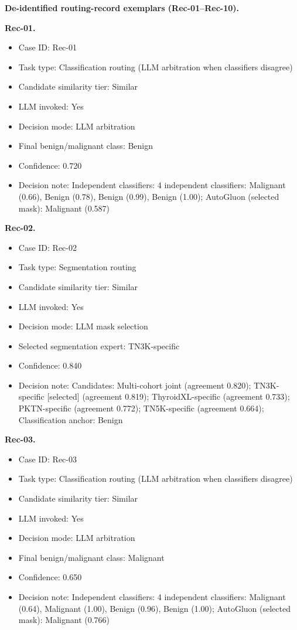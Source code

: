 \noindent\textbf{De-identified routing-record exemplars (Rec-01--Rec-10).}
\label{sec_A1_routing_exemplars}
\par\smallskip
\noindent\textbf{Rec-01.}\par
\begin{itemize}[leftmargin=1.5em,topsep=0.1em,itemsep=0.05em]
\item Case ID: Rec-01
\item Task type: Classification routing (LLM arbitration when classifiers disagree)
\item Candidate similarity tier: Similar
\item LLM invoked: Yes
\item Decision mode: LLM arbitration
\item Final benign/malignant class: Benign
\item Confidence: 0.720
\item Decision note: Independent classifiers: 4 independent classifiers: Malignant (0.66), Benign (0.78), Benign (0.99), Benign (1.00); AutoGluon (selected mask): Malignant (0.587)
\end{itemize}
\noindent\textbf{Rec-02.}\par
\begin{itemize}[leftmargin=1.5em,topsep=0.1em,itemsep=0.05em]
\item Case ID: Rec-02
\item Task type: Segmentation routing
\item Candidate similarity tier: Similar
\item LLM invoked: Yes
\item Decision mode: LLM mask selection
\item Selected segmentation expert: TN3K-specific
\item Confidence: 0.840
\item Decision note: Candidates: Multi-cohort joint (agreement 0.820); TN3K-specific [selected] (agreement 0.819); ThyroidXL-specific (agreement 0.733); PKTN-specific (agreement 0.772); TN5K-specific (agreement 0.664); Classification anchor: Benign
\end{itemize}
\noindent\textbf{Rec-03.}\par
\begin{itemize}[leftmargin=1.5em,topsep=0.1em,itemsep=0.05em]
\item Case ID: Rec-03
\item Task type: Classification routing (LLM arbitration when classifiers disagree)
\item Candidate similarity tier: Similar
\item LLM invoked: Yes
\item Decision mode: LLM arbitration
\item Final benign/malignant class: Malignant
\item Confidence: 0.650
\item Decision note: Independent classifiers: 4 independent classifiers: Malignant (0.64), Malignant (1.00), Benign (0.96), Benign (1.00); AutoGluon (selected mask): Malignant (0.766)
\end{itemize}
